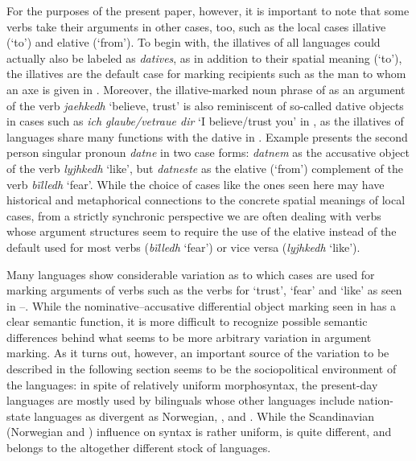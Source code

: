 \documentclass[output=paper]{LSP/langsci}
\begin{document}
 For the purposes of the present paper, however, it is important to note that some verbs take their arguments in other cases, too, such as the local cases illative (‘to’) and elative (‘from’). To begin with, the illatives of all  languages could actually also be labeled as \textit{datives}, as in addition to their spatial meaning (‘to’), the illatives are the default case for marking recipients such as the man to whom an axe is given in . Moreover, the illative-marked noun phrase of  as an argument of the verb \textit{jaehkedh} ‘believe, trust’ is also reminiscent of so-called dative objects in cases such as \textit{ich glaube/vetraue dir} ‘I believe/trust you’ in , as the illatives of  languages share many functions with the dative in . Example  presents the second person singular pronoun \textit{datne} in two case forms: \textit{datnem} as the accusative object of the verb \textit{lyjhkedh} ‘like’, but \textit{datneste} as the elative (‘from’) complement of the verb \textit{bïlledh} ‘fear’. While the choice of cases like the ones seen here may have historical and metaphorical connections to the concrete spatial meanings of local cases, from a strictly synchronic perspective we are often dealing with verbs whose argument structures seem to require the use of the elative instead of the default  used for most verbs (\textit{bïlledh} ‘fear’) or vice versa (\textit{lyjhkedh} ‘like’). 

 Many  languages show considerable variation as to which cases are used for marking arguments of verbs such as the  verbs for ‘trust’, ‘fear’ and ‘like’ as seen in --. While the nominative–accusative differential object marking seen in  has a clear semantic function, it is more difficult to recognize possible semantic differences behind what seems to be more arbitrary variation in  argument marking. As it turns out, however, an important source of the variation to be described in the following section seems to be the sociopolitical environment of the  languages: in spite of relatively uniform morphosyntax, the present-day  languages are mostly used by bilinguals whose other languages include nation-state languages as divergent as Norwegian, ,  and . While the Scandinavian (Norwegian and ) influence on  syntax is rather uniform,  is quite different, and  belongs to the altogether different stock of  languages.
\end{document}
